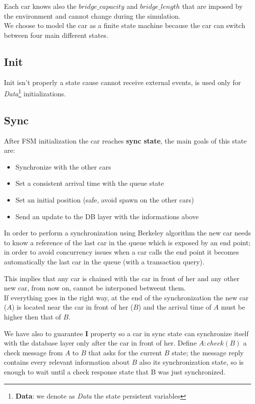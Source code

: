 Each car knows also the $bridge\_capacity$ and $bridge\_length$ that are imposed by the environment and cannot change during the
simulation.\\

We choose to model the car as a finite state machine because the car can switch between four main different states. 
\subsection{Init}

Init isn't properly a state cause cannot receive external events, 
is used only for 
\textit{Data}\footnote{\textbf{Data}: we denote as \textit{Data} 
the state persistent variables} 
initializations.


\subsection{Sync}

After FSM initialization the car reaches \textbf{sync state}, the main goals 
of this state are:

\begin{itemize}
    \item Synchronize with the other cars
    \item Set a consistent arrival time with the queue state 
    \item Set an initial position (safe, avoid spawn on the other cars)
    \item Send an update to the DB layer with the informations above
\end{itemize}

In order to perform a synchronization using Berkeley algorithm the new car needs to 
know a reference of the last car in the queue which is exposed by an end point; 
in order to avoid concurrency issues when a car calls the end point 
it becomes automatically the last car in the queue (with a transaction query).

This implies that any car is chained with the car in front of her and any other 
new car, from now on, cannot be interponed betweent them.\\

\noindent
If everything goes in the right way, at the end of the synchronization the new car ($A$) 
is located near the car in front of her ($B$) and the arrival time of $A$ must be 
higher then that of $B$.

We have also to guarantee \textbf{I} property so a car in sync state can synchronize 
itself with the database layer only after the car in front of her. Define 
$A:check(B)$ a check message from $A$ to $B$ that asks for the current $B$ state;
the message reply contains every relevant information about $B$ also its synchronization 
state, so is enough to wait until a check response state that B was just 
synchronized.  

